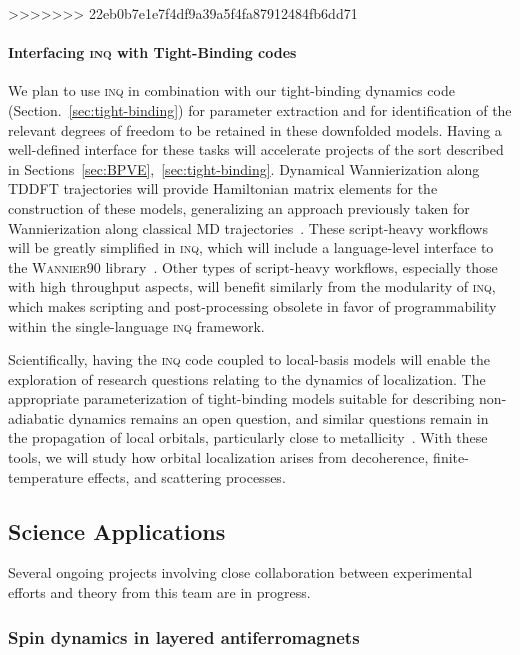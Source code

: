 >>>>>>> 22eb0b7e1e7f4df9a39a5f4fa87912484fb6dd71

\paragraph{Interfacing \textsc{inq} with Tight-Binding codes}\label{sec:future-tb}

We plan to use \textsc{inq} in combination with our tight-binding dynamics code (Section.~\ref{sec:tight-binding}) for parameter extraction and for identification of the relevant degrees of freedom to be retained in these downfolded models. 
Having a well-defined interface for these tasks will accelerate projects of the sort described in Sections~\ref{sec:BPVE},~\ref{sec:tight-binding}. Dynamical Wannierization along TDDFT trajectories will provide Hamiltonian matrix elements for the construction of these models, generalizing an approach previously taken for Wannierization along classical MD trajectories~\cite{Abramovitch2021}. 
These script-heavy workflows will be greatly simplified in \textsc{inq}, which will include a language-level interface to the \textsc{Wannier90} library~\cite{Mostofi2008}. 
Other types of script-heavy workflows, especially those with high throughput aspects, will benefit similarly from the modularity of \textsc{inq}, which makes scripting and post-processing obsolete in favor of programmability within the single-language \textsc{inq} framework.

Scientifically, having the \textsc{inq} code coupled to local-basis models will enable the exploration of research questions relating to the dynamics of localization. 
The appropriate parameterization of tight-binding models suitable for describing non-adiabatic dynamics remains an open question, and similar questions remain in the propagation of local orbitals, particularly close to metallicity~\cite{Yost2019}. 
With these tools, we will study how orbital localization arises from decoherence, finite-temperature effects, and scattering processes.  

\subsection{Science Applications}

Several ongoing projects involving close collaboration between experimental efforts and theory from this team are in progress.

\subsubsection{Spin dynamics in layered antiferromagnets}\label{sec:2dafm}


